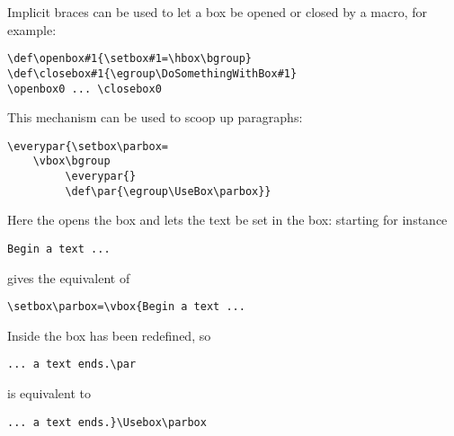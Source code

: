 \documentclass{book}
\begin{document}
Implicit braces can be used to let a box be opened or closed
by a macro, for example:
\begin{verbatim}
\def\openbox#1{\setbox#1=\hbox\bgroup}
\def\closebox#1{\egroup\DoSomethingWithBox#1}
\openbox0 ... \closebox0
\end{verbatim}
This mechanism can be used to scoop up paragraphs:
\begin{verbatim}
\everypar{\setbox\parbox=
    \vbox\bgroup
         \everypar{}
         \def\par{\egroup\UseBox\parbox}}
\end{verbatim}
Here the  opens the box and lets the text be
set in the box: starting for instance
\begin{verbatim}
Begin a text ...
\end{verbatim}
gives the equivalent of
\begin{verbatim}
\setbox\parbox=\vbox{Begin a text ...
\end{verbatim}
Inside the box  has been redefined, so
\begin{verbatim}
... a text ends.\par
\end{verbatim}
is equivalent to
\begin{verbatim}
... a text ends.}\Usebox\parbox
\end{verbatim}
\end{document}
